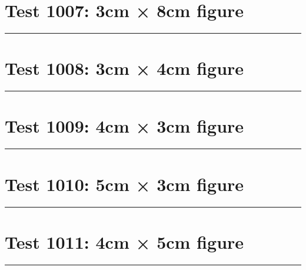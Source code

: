 \documentclass[a4paper,11pt]{article}
\begin{document}
\section*{Test 1007: 3cm × 8cm figure}
\begin{swarmwrap}%
  \begin{minipage}[t]{3cm}
    \centering
    \rule{\linewidth}{8cm}
  \end{minipage}%
\end{swarmwrap}%
\swarmwrapnext
\lipsum[135]
\lipsum[136]
\lipsum[137]
\section*{Test 1008: 3cm × 4cm figure}
\begin{swarmwrap}%
  \begin{minipage}[t]{3cm}
    \centering
    \rule{\linewidth}{4cm}
  \end{minipage}%
\end{swarmwrap}%
\swarmwrapnext
\lipsum[28]
\lipsum[29]
\lipsum[30]
\lipsum[31]
\lipsum[32]
\lipsum[33]
\section*{Test 1009: 4cm × 3cm figure}
\begin{swarmwrap}%
  \begin{minipage}[t]{4cm}
    \centering
    \rule{\linewidth}{3cm}
  \end{minipage}%
\end{swarmwrap}%
\swarmwrapnext
\lipsum[31]
\lipsum[32]
\lipsum[33]
\lipsum[34]
\lipsum[35]
\section*{Test 1010: 5cm × 3cm figure}
\begin{swarmwrap}%
  \begin{minipage}[t]{5cm}
    \centering
    \rule{\linewidth}{3cm}
  \end{minipage}%
\end{swarmwrap}%
\swarmwrapnext
\lipsum[52]
\lipsum[53]
\lipsum[54]
\lipsum[55]
\lipsum[56]
\lipsum[57]
\section*{Test 1011: 4cm × 5cm figure}
\begin{swarmwrap}%
  \begin{minipage}[t]{4cm}
    \centering
    \rule{\linewidth}{5cm}
  \end{minipage}%
\end{swarmwrap}%
\swarmwrapnext
\lipsum[135]
\lipsum[136]
\lipsum[137]
\lipsum[138]
\lipsum[139]
\end{document}

